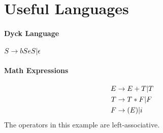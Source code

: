 \section{Useful Languages}

\paragraph{Dyck Language} $S \rightarrow bSeS | \epsilon$
\paragraph{Math Expressions}
\begin{align*}
    E &\rightarrow E + T | T \\
    T &\rightarrow T * F | F \\
    F &\rightarrow (E) | i
\end{align*}
The operators in this example are left-associative.
